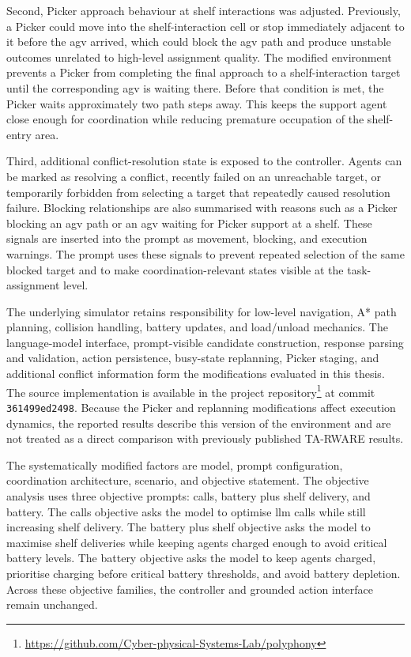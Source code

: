 Second, Picker approach behaviour at shelf interactions was adjusted.
Previously, a Picker could move into the shelf-interaction cell or stop immediately adjacent to it before the \gls{agv} arrived, which could block the \gls{agv} path and produce unstable outcomes unrelated to high-level assignment quality.
The modified environment prevents a Picker from completing the final approach to a shelf-interaction target until the corresponding \gls{agv} is waiting there.
Before that condition is met, the Picker waits approximately two path steps away.
This keeps the support agent close enough for coordination while reducing premature occupation of the shelf-entry area.

Third, additional conflict-resolution state is exposed to the controller.
Agents can be marked as resolving a conflict, recently failed on an unreachable target, or temporarily forbidden from selecting a target that repeatedly caused resolution failure.
Blocking relationships are also summarised with reasons such as a Picker blocking an \gls{agv} path or an \gls{agv} waiting for Picker support at a shelf.
These signals are inserted into the prompt as movement, blocking, and execution warnings.
The prompt uses these signals to prevent repeated selection of the same blocked target and to make coordination-relevant states visible at the task-assignment level.

The underlying simulator retains responsibility for low-level navigation, A* path planning, collision handling, battery updates, and load/unload mechanics.
The language-model interface, prompt-visible candidate construction, response parsing and validation, action persistence, busy-state replanning, Picker staging, and additional conflict information form the modifications evaluated in this thesis.
The source implementation is available in the project repository\footnote{\url{https://github.com/Cyber-physical-Systems-Lab/polyphony}} at commit \texttt{361499ed2498}.
Because the Picker and replanning modifications affect execution dynamics, the reported results describe this version of the environment and are not treated as a direct comparison with previously published TA-RWARE results.


The systematically modified factors are model, prompt configuration, coordination architecture, scenario, and objective statement.
The objective analysis uses three objective prompts: calls, battery plus shelf delivery, and battery.
The calls objective asks the model to optimise \gls{llm} calls while still increasing shelf delivery.
The battery plus shelf objective asks the model to maximise shelf deliveries while keeping agents charged enough to avoid critical battery levels.
The battery objective asks the model to keep agents charged, prioritise charging before critical battery thresholds, and avoid battery depletion.
Across these objective families, the controller and grounded action interface remain unchanged.


